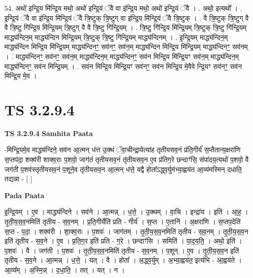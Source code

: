 \documentclass[17pt]{extarticle}
\begin{document}
54. अथो॑ इन्द्रि॒य मि॑न्द्रि॒य मथो॒ अथो॑ इन्द्रि॒यं ॅवै वा इ॑न्द्रि॒य मथो॒ अथो॑ इन्द्रि॒यं ॅवै । . अथो॒ इत्यथो᳚ । . इ॒न्द्रि॒यं ॅवै वा इ॑न्द्रि॒य मि॑न्द्रि॒यं ॅवै त्रि॒ष्टुक् त्रि॒ष्टुग् वा इ॑न्द्रि॒य मि॑न्द्रि॒यं ॅवै त्रि॒ष्टुक् । . वै त्रि॒ष्टुक् त्रि॒ष्टुग् वै वै त्रि॒ष्टु गि॑न्द्रि॒य मि॑न्द्रि॒यम् त्रि॒ष्टुग् वै वै त्रि॒ष्टु गि॑न्द्रि॒यम् । . त्रि॒ष्टु गि॑न्द्रि॒य मि॑न्द्रि॒यम् त्रि॒ष्टुक् त्रि॒ष्टु गि॑न्द्रि॒यम् माद्ध्य॑न्दिन॒म् माद्ध्य॑न्दिन मिन्द्रि॒यम् त्रि॒ष्टुक् त्रि॒ष्टु गि॑न्द्रि॒यम् माद्ध्य॑न्दिनम् । . इ॒न्द्रि॒यम् माद्ध्य॑न्दिन॒म् माद्ध्य॑न्दिन मिन्द्रि॒य मि॑न्द्रि॒यम् माद्ध्य॑न्दिनꣳ॒॒ सव॑नꣳ॒॒ सव॑न॒म् माद्ध्य॑न्दिन मिन्द्रि॒य मि॑न्द्रि॒यम् माद्ध्य॑न्दिनꣳ॒॒ सव॑नम् । . माद्ध्य॑न्दिनꣳ॒॒ सव॑नꣳ॒॒ सव॑न॒म् माद्ध्य॑न्दिन॒म् माद्ध्य॑न्दिनꣳ॒॒ सव॑न मिन्द्रि॒य मि॑न्द्रि॒यꣳ सव॑न॒म् माद्ध्य॑न्दिन॒म् माद्ध्य॑न्दिनꣳ॒॒ सव॑न मिन्द्रि॒यम् । . सव॑न मिन्द्रि॒य मि॑न्द्रि॒यꣳ सव॑नꣳ॒॒ सव॑न मिन्द्रि॒य मे॒वैवे न्द्रि॒यꣳ सव॑नꣳ॒॒ सव॑न मिन्द्रि॒य मे॒व । \newline
\pagebreak
{}

\section{ TS 3.2.9.4 }

\textbf{TS 3.2.9.4 } \newline
\textbf{Samhita Paata} \newline

-मिन्द्रि॒यमे॒व माद्ध्य॑न्दिने॒ सव॑न आ॒त्मन् ध॑त्त उ॒क्थं ॅवा॒चीन्द्रा॒येत्या॑ह तृतीयसव॒नं प्र॑ति॒गीर्य॑ स॒प्तैतान्य॒क्षरा॑णि स॒प्तप॑दा॒ शक्व॑री शाक्व॒राः प॒शवो॒ जाग॑तं तृतीयसव॒नं तृ॑तीयसव॒न ए॒व प्र॑तिग॒रे छन्दाꣳ॑सि॒ संपा॑दय॒त्यथो॑ प॒शवो॒ वै जग॑ती प॒शव॑स्तृतीयसव॒नं प॒शूने॒व तृ॑तीयसव॒न आ॒त्मन् ध॑त्ते॒ यद्वै होता᳚ऽद्ध्व॒र्युम॑भ्या॒ह्वय॑त आ॒व्य॑मस्मिन् दधाति॒ तद्यन्ना - [  ] \newline

\textbf{Pada Paata} \newline

इ॒न्द्रि॒यम् । ए॒व । माद्ध्य॑न्दिने । सव॑ने । आ॒त्मन्न् । ध॒त्ते॒ । उ॒क्थम् । वा॒चि । इन्द्रा॑य । इति॑ । आ॒ह॒ । तृ॒ती॒य॒स॒व॒नमिति॑ तृतीय - स॒व॒नम् । प्र॒ति॒गीर्येति॑ प्रति - गीर्य॑ । स॒प्त । ए॒तानि॑ । अ॒क्षरा॑णि । स॒प्तप॒देति॑ स॒प्त - प॒दा॒ । शक्व॑री । शा॒क्व॒राः । प॒शवः॑ । जाग॑तम् । तृ॒ती॒य॒स॒व॒नमिति॑ तृतीय - स॒व॒नम् । तृ॒ती॒य॒स॒व॒न इति॑ तृतीय - स॒व॒ने । ए॒व । प्र॒ति॒ग॒र इति॑ प्रति - ग॒रे । छन्दाꣳ॑सि । समिति॑ । पा॒द॒य॒ति॒ । अथो॒ इति॑ । प॒शवः॑ । वै । जग॑ती । प॒शवः॑ । तृ॒ती॒य॒स॒व॒नमिति॑ तृतीय - स॒व॒नम् । प॒शून् । ए॒व । तृ॒ती॒य॒स॒व॒न इति॑ तृतीय - स॒व॒ने । आ॒त्मन्न् । ध॒त्ते॒ । यत् । वै । होता᳚ । अ॒द्ध्व॒र्युम् । अ॒भ्या॒ह्वय॑त॒ इत्य॑भि - आ॒ह्वय॑ते । आ॒व्य᳚म् । अ॒स्मि॒न्न् । द॒धा॒ति॒ । तत् । यत् । न ।  \newline
\end{document}
